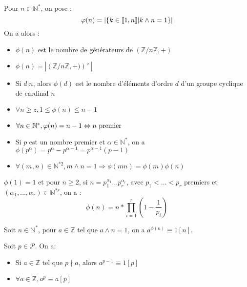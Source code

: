 \begin{defi} Pour $n\in\mathbb{N}^*$, on pose : \[\varphi(n) = \left|\{k\in\llbracket 1, n \rrbracket | k\wedge n = 1\}\right| \]
    On a alors :\begin{itemize}
        \item $\phi(n)$ est le nombre de générateurs de $\left(\mathbb{Z}/n\mathbb{Z}, +\right)$
        \item $\phi(n) = \left|\left(\mathbb{Z}/n\mathbb{Z}, +)\right)^\times\right|$
        \item Si $d|n$, alors $\phi(d)$ est le nombre d'éléments d'ordre $d$ d'un groupe cyclique de cardinal $n$
\end{itemize}\end{defi}

\begin{prop}\begin{itemize}
    \item $\forall n\geq z, 1\leq \phi(n) \leq n-1$
    \item $\forall n\in\mathbb{N}^*, \varphi(n) = n-1 \Leftrightarrow n \text{ premier}$
    \item Si $p$ est un nombre premier et $\alpha\in\mathbb{N}^*$, on a $\phi(p^\alpha) = p^\alpha - p^{\alpha-1} = p^{\alpha-1}(p-1)$
    \item $\forall (m,n)\in\mathbb{N}^{*2}, m\wedge n = 1 \Rightarrow \phi(mn) = \phi(m)\phi(n)$
\end{itemize}\end{prop}

\begin{lemme} $\phi(1)=1$ et pour $n\geq 2$, si $n=p_1^{\alpha_1}\dots p_r^{\alpha_r}$, avec $p_1 < \dots < p_r$ premiers et $(\alpha_1,\dots,\alpha_r)\in\mathbb{N}^{*r}$, on a :
    \[ \phi(n) = n * \prod_{i=1}^r \left(1-\frac{1}{p_i}\right) \]
\end{lemme}

\begin{theo} Soit $n\in\mathbb{N}^*$, pour $a\in\mathbb{Z}$ tel que $a\wedge n=1$, on a $a^{\phi(n)}\equiv 1[n]$.
\end{theo}

\begin{theo} Soit $p\in\mathscr{P}$. On a:\begin{itemize}
    \item Si $a\in\mathbb{Z}$ tel que $p\nmid a$, alors $a^{p-1}\equiv 1[p]$
    \item $\forall a\in\mathbb{Z}, a^p\equiv a[p]$
\end{itemize}\end{theo}

